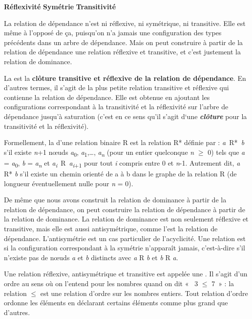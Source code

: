 {    \ea

    \textbf{Réflexivité}      \textbf{Symétrie}              \textbf{Transitivité}
    \z

    La relation de dépendance n’est ni réflexive, ni symétrique, ni transitive. Elle est même à l’opposé de ça, puisqu’on n’a jamais une configuration des types précédents dans un arbre de dépendance. Mais on peut construire à partir de la relation de dépendance une relation réflexive et transitive, et c’est justement la relation de dominance.

    La  est la \textbf{clôture transitive et réflexive de la relation de dépendance}. En d’autres termes, il s’agit de la plus petite relation transitive et réflexive qui contienne la relation de dépendance. Elle est obtenue en ajoutant les configurations correspondant à la transitivité et la réflexivité sur l’arbre de dépendance jusqu’à saturation (c’est en ce sens qu’il s’agit d‘une \textbf{\textit{clôture}} pour la transitivité et la réflexivité).

    Formellement, la  d’une relation binaire R est la relation R* définie par : \textit{a~}R*\textit{~b} s’il existe \textit{n}+1 nœuds \textit{a}\textsubscript{0}, \textit{a}\textsubscript{1},…, \textit{a\textsubscript{n}} (pour un entier quelconque \textit{n} ${\geq}$ 0) tels que \textit{a} = \textit{a}\textsubscript{0}, \textit{b} = \textit{a\textsubscript{n}} et \textit{a\textsubscript{i}}~R~\textit{a\textsubscript{i}}\textsubscript{+1} pour tout \textit{i} compris entre 0 et \textit{n}{}-1. Autrement dit, \textit{a} R* \textit{b} s’il existe un chemin orienté de a à b dans le graphe de la relation R (de longueur éventuellement nulle pour \textit{n} = 0).

    De même que nous avons construit la relation de dominance à partir de la relation de dépendance, on peut construire la relation de dépendance à partir de la relation de dominance. La relation de dominance est non seulement réflexive et transitive, mais elle est aussi antisymétrique, comme l’est la relation de dépendance. L’antisymétrie est un cas particulier de l’acyclicité. Une relation est  si la configuration correspondant à la symétrie n’apparaît jamais, c’est-à-dire s’il n’existe pas de nœuds \textit{a} et \textit{b} distincts avec \textit{a} R \textit{b} et \textit{b} R \textit{a}.

    Une relation réflexive, antisymétrique et transitive est appelée une . Il s’agit d’un ordre au sens où on l’entend pour les nombres quand on dit «~ 3 ${\leq}$ 7~» : la relation ${\leq}$ est une relation d’ordre sur les nombres entiers. Tout relation d’ordre ordonne les éléments en déclarant certains éléments comme plus grand que d’autres.

}
